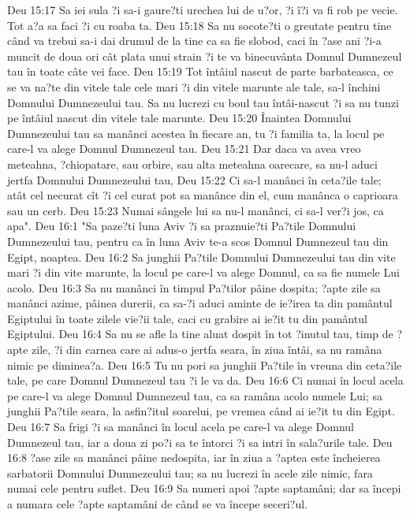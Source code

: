 Deu 15:17  Sa iei sula ?i sa-i gaure?ti urechea lui de u?or, ?i î?i va fi rob pe vecie. Tot a?a sa faci ?i cu roaba ta.
Deu 15:18  Sa nu socote?ti o greutate pentru tine când va trebui sa-i dai drumul de la tine ca sa fie slobod, caci în ?ase ani ?i-a muncit de doua ori cât plata unui strain ?i te va binecuvânta Domnul Dumnezeul tau în toate câte vei face.
Deu 15:19  Tot întâiul nascut de parte barbateasca, ce se va na?te din vitele tale cele mari ?i din vitele marunte ale tale, sa-l închini Domnului Dumnezeului tau. Sa nu lucrezi cu boul tau întâi-nascut ?i sa nu tunzi pe întâiul nascut din vitele tale marunte.
Deu 15:20  Înaintea Domnului Dumnezeului tau sa manânci acestea în fiecare an, tu ?i familia ta, la locul pe care-l va alege Domnul Dumnezeul tau.
Deu 15:21  Dar daca va avea vreo meteahna, ?chiopatare, sau orbire, sau alta meteahna oarecare, sa nu-l aduci jertfa Domnului Dumnezeului tau,
Deu 15:22  Ci sa-l manânci în ceta?ile tale; atât cel necurat cît ?i cel curat pot sa manânce din el, cum manânca o caprioara sau un cerb.
Deu 15:23  Numai sângele lui sa nu-l manânci, ci sa-l ver?i jos, ca apa".
Deu 16:1  "Sa paze?ti luna Aviv ?i sa praznuie?ti Pa?tile Domnului Dumnezeului tau, pentru ca în luna Aviv te-a scos Domnul Dumnezeul tau din Egipt, noaptea.
Deu 16:2  Sa junghii Pa?tile Domnului Dumnezeului tau din vite mari ?i din vite marunte, la locul pe care-l va alege Domnul, ca sa fie numele Lui acolo.
Deu 16:3  Sa nu manânci în timpul Pa?tilor pâine dospita; ?apte zile sa manânci azime, pâinea durerii, ca sa-?i aduci aminte de ie?irea ta din pamântul Egiptului în toate zilele vie?ii tale, caci cu grabire ai ie?it tu din pamântul Egiptului.
Deu 16:4  Sa nu se afle la tine aluat dospit în tot ?inutul tau, timp de ?apte zile, ?i din carnea care ai adus-o jertfa seara, în ziua întâi, sa nu ramâna nimic pe diminea?a.
Deu 16:5  Tu nu pori sa junghii Pa?tile în vreuna din ceta?ile tale, pe care Domnul Dumnezeul tau ?i le va da.
Deu 16:6  Ci numai în locul acela pe care-l va alege Domnul Dumnezeul tau, ca sa ramâna acolo numele Lui; sa junghii Pa?tile seara, la asfin?itul soarelui, pe vremea când ai ie?it tu din Egipt.
Deu 16:7  Sa frigi ?i sa manânci în locul acela pe care-l va alege Domnul Dumnezeul tau, iar a doua zi po?i sa te întorci ?i sa intri în sala?urile tale.
Deu 16:8  ?ase zile sa manânci pâine nedospita, iar în ziua a ?aptea este încheierea sarbatorii Domnului Dumnezeului tau; sa nu lucrezi în acele zile nimic, fara numai cele pentru suflet.
Deu 16:9  Sa numeri apoi ?apte saptamâni; dar sa începi a numara cele ?apte saptamâni de când se va începe seceri?ul.
